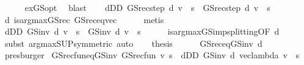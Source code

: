 \begin{isabellebody}
\ \ \ \ \isamarkupfalse%
\ ex{\isacharunderscore}{\kern0pt}GS{\isacharunderscore}{\kern0pt}opt\ \isamarkupfalse%
\ blast\isanewline
\ \ \isamarkupfalse%
\ {\isachardoublequoteopen}{\isacharparenleft}{\kern0pt}{\isasymSqunion}d{\isasymin}D\isactrlsub D{\isachardot}{\kern0pt}\ GS{\isacharunderscore}{\kern0pt}rec{\isacharunderscore}{\kern0pt}step\ d\ v\ {\isachardollar}{\kern0pt}\ s{\isacharparenright}{\kern0pt}\ {\isacharequal}{\kern0pt}\ GS{\isacharunderscore}{\kern0pt}rec{\isacharunderscore}{\kern0pt}step\ d\ v\ {\isachardollar}{\kern0pt}\ s{\isachardoublequoteclose}\isanewline
\ \ \ \ \isamarkupfalse%
\ d\ is{\isacharunderscore}{\kern0pt}arg{\isacharunderscore}{\kern0pt}max{\isacharunderscore}{\kern0pt}GS{\isacharunderscore}{\kern0pt}rec\ GS{\isacharunderscore}{\kern0pt}rec{\isacharunderscore}{\kern0pt}eq{\isacharunderscore}{\kern0pt}vec\isanewline
\ \ \ \ \isamarkupfalse%
\ metis\isanewline
\ \ \isamarkupfalse%
\ {\isachardoublequoteopen}{\isacharparenleft}{\kern0pt}{\isasymSqunion}d{\isasymin}D\isactrlsub D{\isachardot}{\kern0pt}\ GS{\isacharunderscore}{\kern0pt}inv\ d\ v\ {\isachardollar}{\kern0pt}\ s{\isacharparenright}{\kern0pt}\ {\isacharequal}{\kern0pt}\ GS{\isacharunderscore}{\kern0pt}inv\ d\ v\ {\isachardollar}{\kern0pt}\ s{\isachardoublequoteclose}\isanewline
\ \ \ \ \isamarkupfalse%
\ is{\isacharunderscore}{\kern0pt}arg{\isacharunderscore}{\kern0pt}max{\isacharunderscore}{\kern0pt}GS{\isacharunderscore}{\kern0pt}imp{\isacharunderscore}{\kern0pt}splitting{\isacharbrackleft}{\kern0pt}OF\ d{\isacharbrackright}{\kern0pt}\isanewline
\ \ \ \ \isamarkupfalse%
\ {\isacharparenleft}{\kern0pt}subst\ arg{\isacharunderscore}{\kern0pt}max{\isacharunderscore}{\kern0pt}SUP{\isacharbrackleft}{\kern0pt}symmetric{\isacharbrackright}{\kern0pt}{\isacharparenright}{\kern0pt}\ auto\isanewline
\ \ \isamarkupfalse%
\ {\isacharquery}{\kern0pt}thesis\isanewline
\ \ \ \ \isamarkupfalse%
\ GS{\isacharunderscore}{\kern0pt}rec{\isacharunderscore}{\kern0pt}eq{\isacharunderscore}{\kern0pt}GS{\isacharunderscore}{\kern0pt}inv\ d\ \isanewline
\ \ \ \ \isamarkupfalse%
\ presburger\isanewline
{}\isamarkupfalse%
%
\endisatagproof
{\isafoldproof}%
%
\isadelimproof
\isanewline
%
\endisadelimproof
\isanewline
{}\isamarkupfalse%
\ GS{\isacharunderscore}{\kern0pt}rec{\isacharunderscore}{\kern0pt}fun{\isacharunderscore}{\kern0pt}eq{\isacharunderscore}{\kern0pt}GS{\isacharunderscore}{\kern0pt}inv{\isacharcolon}{\kern0pt}\ {\isachardoublequoteopen}GS{\isacharunderscore}{\kern0pt}rec{\isacharunderscore}{\kern0pt}fun\ v\ s\ {\isacharequal}{\kern0pt}\ {\isacharparenleft}{\kern0pt}{\isasymSqunion}d{\isasymin}D\isactrlsub D{\isachardot}{\kern0pt}\ GS{\isacharunderscore}{\kern0pt}inv\ d\ {\isacharparenleft}{\kern0pt}vec{\isacharunderscore}{\kern0pt}lambda\ v{\isacharparenright}{\kern0pt}\ {\isachardollar}{\kern0pt}\ s{\isacharparenright}{\kern0pt}{\isachardoublequoteclose}\isanewline

\end{isabellebody}
